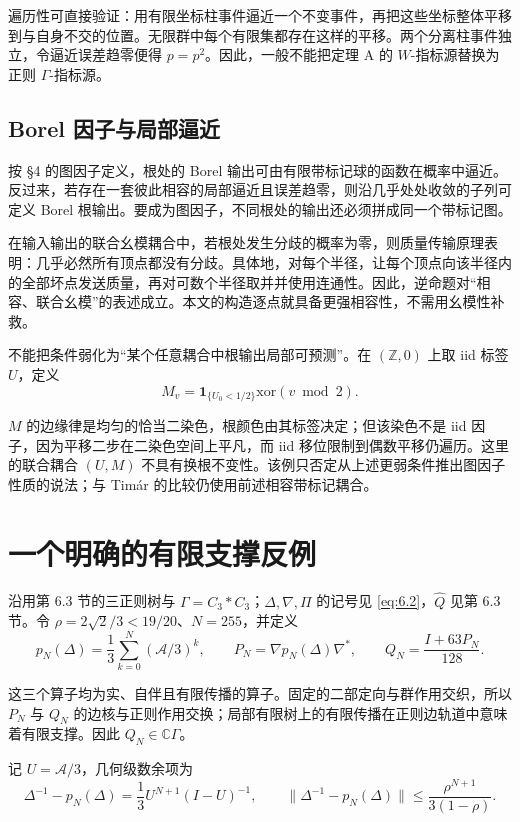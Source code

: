 \documentclass[UTF8,zihao=-4,a4paper]{ctexart}
\numberwithin{equation}{section}
\begin{document}
遍历性可直接验证：用有限坐标柱事件逼近一个不变事件，再把这些坐标整体平移到与自身不交的位置。无限群中每个有限集都存在这样的平移。两个分离柱事件独立，令逼近误差趋零便得 \(p=p^2\)。因此，一般不能把定理 A 的 \(W\)-指标源替换为正则 \(\Gamma\)-指标源。

\subsection{Borel 因子与局部逼近}

按 \S{}4 的图因子定义，根处的 Borel 输出可由有限带标记球的函数在概率中逼近。反过来，若存在一套彼此相容的局部逼近且误差趋零，则沿几乎处处收敛的子列可定义 Borel 根输出。要成为图因子，不同根处的输出还必须拼成同一个带标记图。

在输入输出的联合幺模耦合中，若根处发生分歧的概率为零，则质量传输原理表明：几乎必然所有顶点都没有分歧。具体地，对每个半径，让每个顶点向该半径内的全部坏点发送质量，再对可数个半径取并并使用连通性。因此，逆命题对“相容、联合幺模”的表述成立。本文的构造逐点就具备更强相容性，不需用幺模性补救。

不能把条件弱化为“某个任意耦合中根输出局部可预测”。在 \((\mathbb Z,0)\) 上取 iid 标签 \(U\)，定义
\[
M_v=\mathbf1_{\{U_0<1/2\}}\mathbin{\mathrm{xor}}(v\bmod2).
\]

\(M\) 的边缘律是均匀的恰当二染色，根颜色由其标签决定；但该染色不是 iid 因子，因为平移二步在二染色空间上平凡，而 iid 移位限制到偶数平移仍遍历。这里的联合耦合 \((U,M)\) 不具有换根不变性。该例只否定从上述更弱条件推出图因子性质的说法；与 Timár 的比较仍使用前述相容带标记耦合。

\section{一个明确的有限支撑反例}

沿用第 6.3 节的三正则树与 \(\Gamma=C_3*C_3\)；\(\Delta,\nabla,\Pi\) 的记号见 \eqref{eq:6.2}，\(\widehat Q\) 见第 6.3 节。令
\(\rho=2\sqrt2/3<19/20\)、\(N=255\)，并定义
\[
p_N(\Delta)=\frac13\sum_{k=0}^{N}(\mathcal A/3)^k,\qquad
P_N=\nabla p_N(\Delta)\nabla^*,\qquad
Q_N=\frac{I+63P_N}{128}.
\tag{B.1}\label{eq:B.1}
\]

这三个算子均为实、自伴且有限传播的算子。固定的二部定向与群作用交织，所以 \(P_N\) 与 \(Q_N\) 的边核与正则作用交换；局部有限树上的有限传播在正则边轨道中意味着有限支撑。因此
\(Q_N\in\mathbb C\Gamma\)。

记 \(U=\mathcal A/3\)，几何级数余项为
\[
\Delta^{-1}-p_N(\Delta)
=\frac13U^{N+1}(I-U)^{-1},\qquad
\|\Delta^{-1}-p_N(\Delta)\|
\le\frac{\rho^{N+1}}{3(1-\rho)}.
\]
\end{document}
